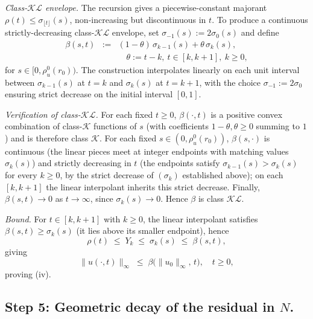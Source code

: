 \documentclass[amsthm]{autart}
\theoremstyle{plain}
\theoremstyle{definition}
\begin{document}
\emph{Class-$\mathcal{KL}$ envelope.} The recursion gives a piecewise-constant majorant $\rho(t) \le \sigma_{\lfloor t \rfloor}(s)$, non-increasing but discontinuous in $t$. To produce a continuous strictly-decreasing class-$\mathcal{KL}$ envelope, set $\sigma_{-1}(s) := 2\sigma_0(s)$ and define
\begin{eqnarray}
\beta(s, t) &:=& (1-\theta)\,\sigma_{k-1}(s) + \theta\,\sigma_k(s), \nonumber \\
&& \quad \theta := t - k, \ t \in [k, k+1], \ k \ge 0,
\label{eq:beta_def}
\end{eqnarray}
for $s \in [0, \rho_u^0(r_0))$. The construction interpolates linearly on each unit interval between $\sigma_{k-1}(s)$ at $t = k$ and $\sigma_k(s)$ at $t = k+1$, with the choice $\sigma_{-1} := 2\sigma_0$ ensuring strict decrease on the initial interval $[0, 1]$.

\emph{Verification of class-$\mathcal{KL}$.} For each fixed $t \ge 0$, $\beta(\cdot, t)$ is a positive convex combination of class-$\mathcal{K}$ functions of $s$ (with coefficients $1-\theta, \theta \ge 0$ summing to $1$) and is therefore class $\mathcal{K}$. For each fixed $s \in (0, \rho_u^0(r_0))$, $\beta(s, \cdot)$ is continuous (the linear pieces meet at integer endpoints with matching values $\sigma_k(s)$) and strictly decreasing in $t$ (the endpoints satisfy $\sigma_{k-1}(s) > \sigma_k(s)$ for every $k \ge 0$, by the strict decrease of $(\sigma_k)$ established above); on each $[k, k+1]$ the linear interpolant inherits this strict decrease. Finally, $\beta(s, t) \to 0$ as $t \to \infty$, since $\sigma_k(s) \to 0$. Hence $\beta$ is class $\mathcal{KL}$.

\emph{Bound.} For $t \in [k, k+1]$ with $k \ge 0$, the linear interpolant satisfies $\beta(s, t) \ge \sigma_k(s)$ (it lies above its smaller endpoint), hence
\begin{equation}
\rho(t) \;\le\; Y_k \;\le\; \sigma_k(s) \;\le\; \beta(s, t),
\label{eq:rho_under_beta}
\end{equation}
giving
\begin{equation}
\|u(\cdot, t)\|_\infty \;\le\; \beta\bigl(\|u_0\|_\infty,\, t\bigr), \quad t \ge 0,
\label{eq:KL_assembled}
\end{equation}
proving (iv).

\subsection*{Step 5: Geometric decay of the residual in $N$.}
\end{document}
